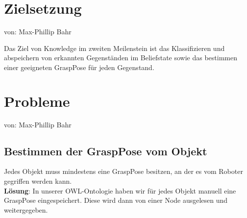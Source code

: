 \documentclass{suturo}
\begin{document}

\makeatletter
\newcommand{\chapterauthor}[1]{%
  {\parindent0pt\vspace*{-27pt}%
  \linespread{0}\small\begin{flushright}von: #1\end{flushright}%
  \par\nobreak\vspace*{0pt}}
  \@afterheading%
}
\makeatother

\section*{Zielsetzung}
\chapterauthor{Max-Phillip Bahr}
Das Ziel von Knowledge im zweiten Meilenstein ist das Klassifizieren und abspeichern von erkannten Gegenständen im Beliefstate sowie das bestimmen einer geeigneten GraspPose für jeden Gegenstand.

\section*{Probleme}
\chapterauthor{Max-Phillip Bahr}
\subsection*{Bestimmen der GraspPose vom Objekt}
Jedes Objekt muss mindestens eine GraspPose besitzen, an der es vom Roboter gegriffen werden kann.\\
\textbf{Lösung}: In unserer OWL-Ontologie haben wir für jedes Objekt manuell eine GraspPose eingespeichert. Diese wird dann von einer Node ausgelesen und weitergegeben.
\end{document}
